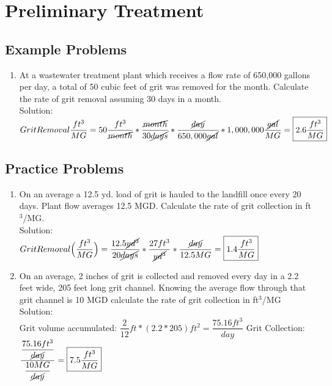 \documentclass{article}
\begin{document}
\section{Preliminary Treatment}

\subsection{Example Problems} 

\begin{enumerate}

\item At a wastewater treatment plant which receives a flow rate of 650,000 gallons per day, a total of 50 cubic feet of grit was removed for the month. Calculate the rate of grit removal assuming 30 days in a month.\\
Solution:\\
$Grit Removal\dfrac{ft^3}{MG}=50\dfrac{ft^3}{ \cancel{month}}*\dfrac{\cancel{month}}{30\cancel{days}}*\dfrac{\cancel{day}}{650,000\cancel{gal}}*1,000,000\dfrac{\cancel{gal}}{MG}=\boxed{2.6\dfrac{ft^3}{MG}}$

\end{enumerate}

\subsection{Practice Problems} 

\begin{enumerate}
\item On an average a 12.5 yd. load of grit is hauled to the landfill once every 20 days. Plant flow averages 12.5 MGD. Calculate the rate of grit collection in ft$^3$/MG.\\
Solution:\\
$Grit Removal\Big(\dfrac{ft^3}{MG}\Big)=\dfrac{12.5\cancel{yd^3}}{ 20\cancel{days}}*\dfrac{27ft^3}{ \cancel{yd^3}}*\dfrac{\cancel{day}}{12.5MG}=\boxed{1.4\dfrac{ft^3}{MG}}$

\item On an average, 2 inches of grit is collected and removed every day in a 2.2 feet wide, 205 feet long grit channel.  Knowing the average flow through that grit channel is 10 MGD calculate the rate of grit collection in ft$^3$/MG\\
Solution:\\
Grit volume accumulated:  $\dfrac{2}{12}ft*(2.2*205)ft^2=\dfrac{75.16ft^3}{day}$
Grit Collection: $\dfrac{\dfrac{75.16ft^3}{\cancel{day}}}{\dfrac{10MG}{\cancel{day}}}=\boxed{7.5\dfrac{ft^3}{MG}}$ 

\end{enumerate}
\end{document}
